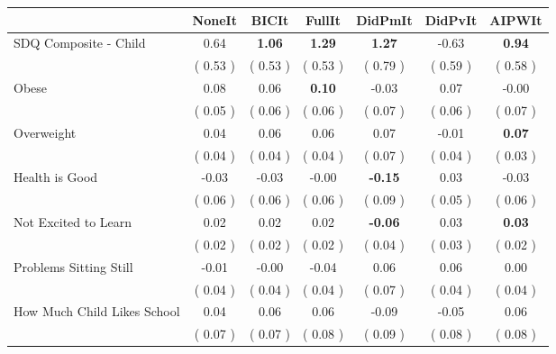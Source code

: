 \begin{tabular}{l c c c c c c}
\toprule
 & NoneIt & BICIt & FullIt & DidPmIt & DidPvIt & AIPWIt \\
\midrule
SDQ Composite - Child &      0.64 & \textbf{      1.06 } & \textbf{      1.29 } & \textbf{      1.27 } &     -0.63 & \textbf{     0.94} \\
& (     0.53 ) & (     0.53 ) & (     0.53 ) & (     0.79 ) & (     0.59 ) & (     0.58 ) \\
Obese &      0.08 &      0.06 & \textbf{      0.10 } &     -0.03 &      0.07 &     -0.00 \\
& (     0.05 ) & (     0.06 ) & (     0.06 ) & (     0.07 ) & (     0.06 ) & (     0.07 ) \\
Overweight &      0.04 &      0.06 &      0.06 &      0.07 &     -0.01 & \textbf{     0.07} \\
& (     0.04 ) & (     0.04 ) & (     0.04 ) & (     0.07 ) & (     0.04 ) & (     0.03 ) \\
Health is Good &     -0.03 &     -0.03 &     -0.00 & \textbf{     -0.15 } &      0.03 &     -0.03 \\
& (     0.06 ) & (     0.06 ) & (     0.06 ) & (     0.09 ) & (     0.05 ) & (     0.06 ) \\
Not Excited to Learn &      0.02 &      0.02 &      0.02 & \textbf{     -0.06 } &      0.03 & \textbf{     0.03} \\
& (     0.02 ) & (     0.02 ) & (     0.02 ) & (     0.04 ) & (     0.03 ) & (     0.02 ) \\
Problems Sitting Still &     -0.01 &     -0.00 &     -0.04 &      0.06 &      0.06 &      0.00 \\
& (     0.04 ) & (     0.04 ) & (     0.04 ) & (     0.07 ) & (     0.04 ) & (     0.04 ) \\
How Much Child Likes School &      0.04 &      0.06 &      0.06 &     -0.09 &     -0.05 &      0.06 \\
& (     0.07 ) & (     0.07 ) & (     0.08 ) & (     0.09 ) & (     0.08 ) & (     0.08 ) \\
\bottomrule
\end{tabular}
